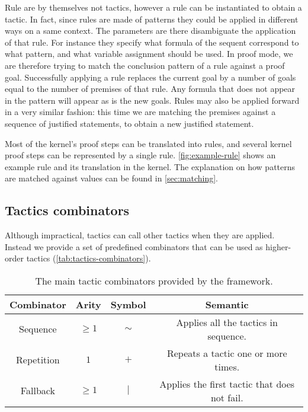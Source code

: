 Rule are by themselves not tactics, however a rule can be instantiated to obtain a tactic. In fact, since rules are made of patterns they could be applied in different ways on a same context. The parameters are there disambiguate the application of that rule. For instance they specify what formula of the sequent correspond to what pattern, and what variable assignment should be used. In proof mode, we are therefore trying to match the conclusion pattern of a rule against a proof goal. Successfully applying a rule replaces the current goal by a number of goals equal to the number of premises of that rule. Any formula that does not appear in the pattern will appear as is the new goals.
Rules may also be applied forward in a very similar fashion: this time we are matching the premises against a sequence of justified statements, to obtain a new justified statement.

Most of the kernel's proof steps can be translated into rules, and several kernel proof steps can be represented by a single rule. \autoref{fig:example-rule} shows an example rule and its translation in the kernel. The explanation on how patterns are matched against values can be found in \autoref{sec:matching}.

\subsection{Tactics combinators}

Although impractical, tactics can call other tactics when they are applied. Instead we provide a set of predefined combinators that can be used as higher-order tactics (\autoref{tab:tactics-combinators}).

\begin{table}[hbt!]
  \centering
  \begin{tabular}{||c c c c||}
  \hline
  \textbf{Combinator} & \textbf{Arity} & \textbf{Symbol} & \textbf{Semantic} \\
  \hline\hline
  Sequence & $\geq 1$ & $\sim$ & Applies all the tactics in sequence. \\ \hline
  Repetition & $1$ & $+$ & Repeats a tactic one or more times. \\ \hline
  Fallback & $\geq 1$ & $|$ & Applies the first tactic that does not fail. \\ \hline
  \end{tabular}
  \caption[Available combinators]{The main tactic combinators provided by the framework.}
  \label{tab:tactics-combinators}
\end{table}

